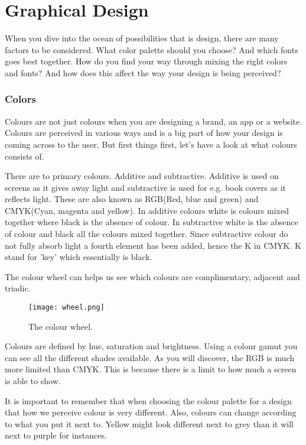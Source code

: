 \section{Graphical Design}
When you dive into the ocean of possibilities that is design, there are many factors to be considered. What color palette should you choose? And which fonts goes best together. How do you find your way through mixing the right colors and fonts? And how does this affect the way your design is being perceived? 

\subsubsection{Colors}

Colours are not just colours when you are designing a brand, an app or a website. Colours are perceived in various ways and is a big part of how your design is coming  across to the user. %
But first things first, let's have a look at what colours consists of.

There are to primary colours. Additive and subtractive. Additive is used on screens as it gives away light and subtractive is used for e.g. book covers as it reflects light. \cite{Colour}
These are also known as RGB(Red, blue and green) and CMYK(Cyan, magenta and yellow).
In additive colours white is colours mixed together where black is the absence of colour. In subtractive white is the absence of colour and black all the colours mixed together. 
Since subtractive colour do not fully absorb light a fourth element has been added, hence the K in CMYK. K stand for 'key' which essentially is black.\cite{Colour}

The colour wheel can helps us see which colours are complimentary, adjacent and triadic. 
\begin{figure}[H]
\centering
\texttt{[image: wheel.png]}
\caption{The colour wheel. \cite{Colour}}
\end{figure}

Colours are defined by hue, saturation and brightness. 
Using a colour gamut you can see all the different shades available. As you will discover, the RGB is much more limited than CMYK. This is because there is a limit to how much a screen is able to show. 

It is important to remember that when choosing the colour palette for a design that how we perceive colour is very different. Also, colours can change according to what you put it next to. Yellow might look different next to grey than it will next to purple for instances. \cite{Colour}

